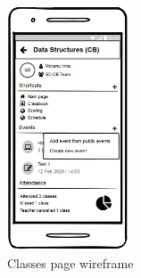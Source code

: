 \begin{figure}[!ht]
     \hfill
     \includegraphics[width=0.32\textwidth]{figures/app/balsamiq/add_event.png}
    \caption{Classes page wireframe}
    \label{4:fig:balsamiq_classes}
\end{figure}

